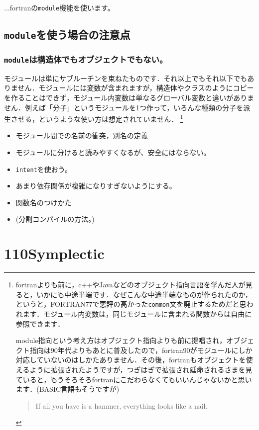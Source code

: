 \documentclass[a4,10pt]{article}
\begin{document}
...fortranの{\tt module}機能を使います。

\subsection{{\tt module}を使う場合の注意点}
\subsubsection{{\tt module}は構造体でもオブジェクトでもない。}
モジュールは単にサブルーチンを束ねたものです．それ以上でもそれ以下でもありません．モジュールには変数が含まれますが，構造体やクラスのようにコピーを作ることはできず，モジュール内変数は単なるグローバル変数と違いがありません．例えば「分子」というモジュールを1つ作って，いろんな種類の分子を派生させる，というような使い方は想定されていません．
\footnote{fortranよりも前に，c++やJavaなどのオブジェクト指向言語を学んだ人が見ると，いかにも中途半端です．なぜこんな中途半端なものが作られたのか，というと，FORTRAN77で悪評の高かった{\tt common}文を廃止するためだと思われます．モジュール内変数は，同じモジュールに含まれる関数からは自由に参照できます．

module指向という考え方はオブジェクト指向よりも前に提唱され，オブジェクト指向は90年代よりもあとに普及したので，fortran90がモジュールにしか対応していないのはしかたありません．その後，fortranもオブジェクトを使えるように拡張されたようですが，つぎはぎで拡張され延命されるさまを見ていると，もうそろそろfortranにこだわらなくてもいいんじゃないかと思います．(BASIC言語もそうですが)
\begin{quote}
If all you have is a hammer, everything looks like a nail.
\end{quote}
}
\begin{itemize}
\item モジュール間での名前の衝突，別名の定義
\item モジュールに分けると読みやすくなるが、安全にはならない。
\item {\tt intent}を使おう。
\item あまり依存関係が複雑になりすぎないようにする。
\item 関数名のつけかた
\item (分割コンパイルの方法。)
\end{itemize}



\section{110Symplectic}
\end{document}
